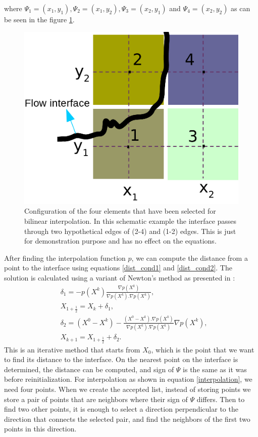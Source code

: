 \documentclass[review]{elsarticle}
\begin{document}
where $\varPsi_1=(x_1,y_1), \varPsi_2=(x_1,y_2), \varPsi_3=(x_2,y_1)$ and $\varPsi_4=(x_2,y_2)$ as can be seen in the figure \ref{fig:bilinear_interp}.
\begin{figure}[ht]
\centering
\includegraphics[scale=.15]{IMAGES/bilinear_interp.png}
\caption{Configuration of the four elements that have been selected for bilinear interpolation. In this schematic example the interface passes through two hypothetical edges of (2-4) and (1-2) edges. This is just for demonstration purpose and has no effect on the equations.}
                \label{fig:bilinear_interp}
\end{figure}
After finding the interpolation function $p$, we can compute the distance from a point to the interface using equations \eqref{dist_cond1} and \eqref{dist_cond2}. 
The solution is calculated using a variant of Newton's method as presented in \cite{Chopp2001}:
\begin{subequations}
\label{eqnewton}
\begin{align}
&\delta_1=-p(X^k)\frac{\nabla p(X^k)}{\nabla p(X^k).\nabla p(X^k)},\\
& X_{1+\frac{1}{2}}=X_k+\delta_1,\\
& \delta_2=(X^0-X^k)-\frac{(X^0-X^k).\nabla p(X^k)}{\nabla p(X^k).\nabla p(X^k)}\nabla p(X^k),\\
&X_{k+1}=X_{1+\frac{1}{2}}+\delta_2.
\end{align}
\end{subequations}
This is an iterative method that starts from $X_0$, which is the point that we want to find its distance to the interface. 
On the nearest point on the interface is determined, the distance can be computed, and sign of $\varPsi$ is the same as it was before reinitialization.
For interpolation as shown in equation \eqref{interpolation}, we need four points. When we create the accepted list, instead of storing points we store a pair of points that are 
neighbors where their sign of $\varPsi$ differs. Then to find two other points, it is enough to select a direction perpendicular to the direction that connects the selected pair, 
and find the neighbors of the first two points in this direction. 
\end{document}
